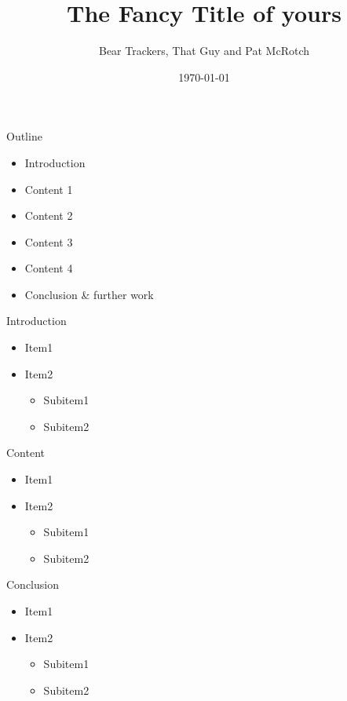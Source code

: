 \documentclass[a4paper]{beamer}
\title[title]{The Fancy Title of yours}
\author[Cool People]{Bear Trackers, That Guy and Pat McRotch}
\date{\today}
\begin{document}
%
\begin{frame}
	\maketitle
\end{frame}

\begin{frame}{Outline}
	\begin{itemize}
		\item Introduction
		\vfill
		\item Content 1
		\vfill
		\item Content 2 
		\vfill
		\item Content 3
		\vfill
		\item Content 4
		\vfill
		\item Conclusion \& further work
		\vfill
	\end{itemize}
\end{frame}

\begin{frame}{Introduction}
	\begin{itemize}
		\item Item1
		\item Item2
			\begin{itemize}
				\item Subitem1
				\item Subitem2
			\end{itemize}
	\end{itemize}
\end{frame}

\begin{frame}{Content}
	\begin{itemize}
		\item Item1
		\item Item2
			\begin{itemize}
				\item Subitem1
				\item Subitem2
			\end{itemize}
	\end{itemize}
\end{frame}

\begin{frame}{Conclusion}
	\begin{itemize}
		\item Item1
		\item Item2
			\begin{itemize}
				\item Subitem1
				\item Subitem2
			\end{itemize}
	\end{itemize}
\end{frame}

\begin{frame}
	\maketitle
\end{frame}
\end{document}
